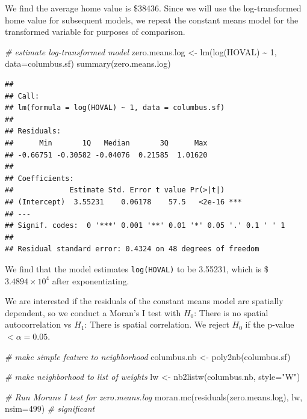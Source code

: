 \documentclass[
]{article}
\newenvironment{Shaded}{\begin{snugshade}}{\end{snugshade}}
\newcommand{\AttributeTok}[1]{\textcolor[rgb]{0.77,0.63,0.00}{#1}}
\newcommand{\CommentTok}[1]{\textcolor[rgb]{0.56,0.35,0.01}{\textit{#1}}}
\newcommand{\DecValTok}[1]{\textcolor[rgb]{0.00,0.00,0.81}{#1}}
\newcommand{\FunctionTok}[1]{\textcolor[rgb]{0.00,0.00,0.00}{#1}}
\newcommand{\NormalTok}[1]{#1}
\newcommand{\OtherTok}[1]{\textcolor[rgb]{0.56,0.35,0.01}{#1}}
\newcommand{\SpecialCharTok}[1]{\textcolor[rgb]{0.00,0.00,0.00}{#1}}
\newcommand{\StringTok}[1]{\textcolor[rgb]{0.31,0.60,0.02}{#1}}
\begin{document}
We find the average home value is \$38436. Since we will use the
log-transformed home value for subsequent models, we repeat the constant
means model for the transformed variable for purposes of comparison.

\begin{Shaded}
\begin{Highlighting}[]
\CommentTok{\# estimate log{-}transformed model}
\NormalTok{zero.means.log }\OtherTok{\textless{}{-}} \FunctionTok{lm}\NormalTok{(}\FunctionTok{log}\NormalTok{(HOVAL) }\SpecialCharTok{\textasciitilde{}} \DecValTok{1}\NormalTok{, }\AttributeTok{data=}\NormalTok{columbus.sf)}
\FunctionTok{summary}\NormalTok{(zero.means.log)}
\end{Highlighting}
\end{Shaded}

\begin{verbatim}
## 
## Call:
## lm(formula = log(HOVAL) ~ 1, data = columbus.sf)
## 
## Residuals:
##      Min       1Q   Median       3Q      Max 
## -0.66751 -0.30582 -0.04076  0.21585  1.01620 
## 
## Coefficients:
##             Estimate Std. Error t value Pr(>|t|)    
## (Intercept)  3.55231    0.06178    57.5   <2e-16 ***
## ---
## Signif. codes:  0 '***' 0.001 '**' 0.01 '*' 0.05 '.' 0.1 ' ' 1
## 
## Residual standard error: 0.4324 on 48 degrees of freedom
\end{verbatim}

We find that the model estimates \texttt{log(HOVAL)} to be 3.55231,
which is \$ \ensuremath{3.4894\times 10^{4}} after exponentiating.

We are interested if the residuals of the constant means model are
spatially dependent, so we conduct a Moran's I test with \(H_0\): There
is no spatial autocorrelation vs \(H_1\): There is spatial correlation.
We reject \(H_0\) if the p-value \(< \alpha = 0.05\).

\begin{Shaded}
\begin{Highlighting}[]
\CommentTok{\# make simple feature to neighborhood}
\NormalTok{columbus.nb }\OtherTok{\textless{}{-}} \FunctionTok{poly2nb}\NormalTok{(columbus.sf)}

\CommentTok{\# make neighborhood to list of weights}
\NormalTok{lw }\OtherTok{\textless{}{-}} \FunctionTok{nb2listw}\NormalTok{(columbus.nb, }\AttributeTok{style=}\StringTok{"W"}\NormalTok{)}

\CommentTok{\# Run Moran\textquotesingle{}s I test for zero.means.log}
\FunctionTok{moran.mc}\NormalTok{(}\FunctionTok{residuals}\NormalTok{(zero.means.log), lw, }\AttributeTok{nsim=}\DecValTok{499}\NormalTok{) }\CommentTok{\# significant}
\end{Highlighting}
\end{Shaded}
\end{document}
